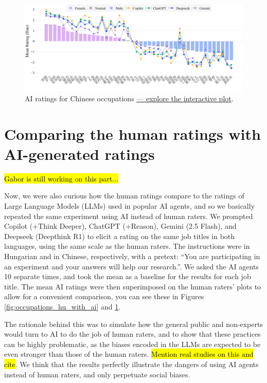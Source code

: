 \documentclass[11pt]{article}
\begin{document}
\begin{figure}[tbp]
  \centering
  \includegraphics[width=\linewidth]{../occupations_zh_with_ai}
  \caption{AI ratings for Chinese occupations \href{https://htmlpreview.github.io/?https://github.com/partigabor/occupational-bias/blob/main/occupations_zh_with_ai.html}{--- explore the interactive plot}.}
  \label{fig:occupations_zh_with_ai}
\end{figure}

\section{Comparing the human ratings with AI-generated ratings}

\hl{Gabor is still working on this part...}

Now, we were also curious how the human ratings compare to the ratings of Large Language Models (LLMs) used in popular AI agents, and so we basically repeated the same experiment using AI instead of human raters. We prompted Copilot (+Think Deeper), ChatGPT (+Reason), Gemini (2.5 Flash), and Deepseek (Deepthink R1) to elicit a rating on the same job titles in both languages, using the same scale as the human raters. The instructions were in Hungarian and in Chinese, respectively, with a pretext: ``You are participating in an experiment and your answers will help our research.''. We asked the AI agents 10 separate times, and took the mean as a baseline for the results for each job title. The mean AI ratings were then superimposed on the human raters' plots to allow for a convenient comparison, you can see these in Figures \ref{fig:occupations_hu_with_ai} and \ref{fig:occupations_zh_with_ai}.

The rationale behind this was to simulate how the general public and non-experts would turn to AI to do the job of human raters, and to show that these practices can be highly problematic, as the biases encoded in the LLMs are expected to be even stronger than those of the human raters. \hl{Mention real studies on this and cite}. We think that the results perfectly illustrate the dangers of using AI agents instead of human raters, and only perpetuate social biases.
\end{document}
